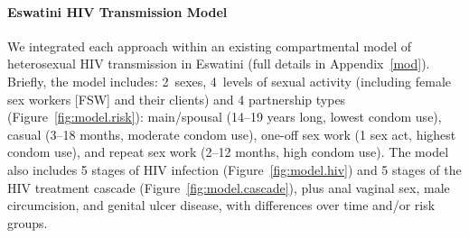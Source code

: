 \paragraph{Eswatini HIV Transmission Model}
We integrated each approach within an existing compartmental model
of heterosexual HIV transmission in Eswatini \cite{Knight2024art}
(full details in Appendix~\ref{mod}).
Briefly, the model includes: 2~sexes, 4~levels of sexual activity
(including female sex workers [FSW] and their clients)
and 4 partnership types (Figure~\ref{fig:model.risk}): %
main/spousal (14--19 years long, lowest condom use),
casual (3--18 months, moderate condom use),
one-off sex work (1 sex act, highest condom use), and
repeat sex work (2--12 months, high condom use).
The model also includes
5 stages of HIV infection (Figure~\ref{fig:model.hiv}) and
5 stages of the HIV treatment cascade (Figure~\ref{fig:model.cascade}), plus
anal \vs vaginal sex, male circumcision, and genital ulcer disease,
with differences over time and/or risk groups.
